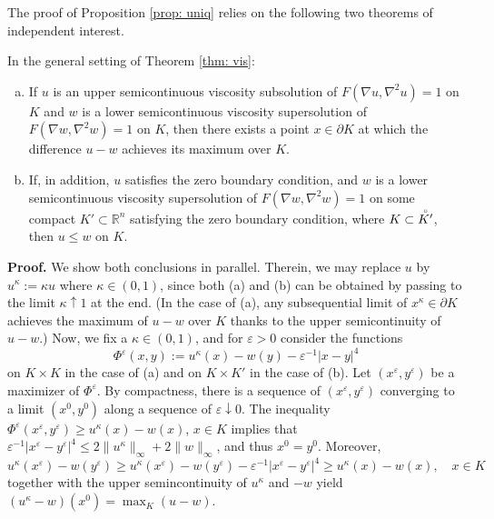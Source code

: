 \documentclass[11pt]{amsart}
\numberwithin{equation}{section}
\newcommand{\rr}{\mathbb{R}}
\begin{document}
The proof of Proposition \ref{prop: uniq} relies on the following two theorems of independent interest. 

\begin{thm} \label{thm: maximum}
In the general setting of Theorem \ref{thm: vis}:
\begin{enumerate}[(a)]
\item If $u$ is an upper semicontinuous viscosity subsolution of $F(\nabla u,\nabla^2u)=1$ on $K$ and $w$ is a lower semicontinuous viscosity supersolution of $F(\nabla w,\nabla^2w)=1$ on $K$, then there exists a point $x \in \partial K$ at which the difference $u-w$ achieves its maximum over $K$. \\
\item If, in addition, $u$ satisfies the zero boundary condition, and $w$ is a lower semicontinuous viscosity supersolution of $F(\nabla w,\nabla^2w)=1$ on some compact $K'\subset\rr^n$ satisfying the zero boundary condition, where $K\subset\accentset{\circ}{K'}$, then $u \le w$ on $K$.
\end{enumerate}
\end{thm} 

\noindent\textbf{Proof.} We show both conclusions in parallel. Therein, we may replace $u$ by $u^\kappa:=\kappa u$ where $\kappa\in(0,1)$, since both (a) and (b) can be obtained by passing to the limit $\kappa\uparrow1$ at the end. (In the case of (a), any subsequential limit of $x^\kappa\in\partial K$ achieves the maximum of $u-w$ over $K$ thanks to the upper semicontinuity of $u-w$.) Now, we fix a $\kappa\in(0,1)$, and for $\varepsilon>0$ consider the functions
\begin{equation}
\Phi^\varepsilon(x,y) := u^\kappa(x) - w(y) - \varepsilon^{-1} |x-y|^4
\end{equation}
on $K\times K$ in the case of (a) and on $K\times K'$ in the case of (b). Let $(x^\varepsilon,y^\varepsilon)$ be a maximizer of $\Phi^\varepsilon$. By compactness, there is a sequence of $(x^\varepsilon,y^\varepsilon)$ converging to a limit $(x^0,y^0)$ along a sequence of $\varepsilon\downarrow0$. The inequality $\Phi^\varepsilon(x^\varepsilon,y^\varepsilon)\ge u^\kappa(x)-w(x)$, $x\in K$ implies that $\varepsilon^{-1}|x^\varepsilon-y^\varepsilon|^4 \le 2\|u^\kappa\|_\infty+2\|w\|_\infty$, and thus $x^0=y^0$. Moreover, 
\begin{equation}
u^\kappa(x^\varepsilon)-w(y^\varepsilon)
\ge u^\kappa(x^\varepsilon)-w(y^\varepsilon)-\varepsilon^{-1} |x^\varepsilon-y^\varepsilon|^4
\ge u^\kappa(x)-w(x),\quad x\in K
\end{equation}
together with the upper semincontinuity of $u^\kappa$ and $-w$ yield $(u^\kappa-w)(x^0) = \max_K(u-w)$. 
	
\end{document}
